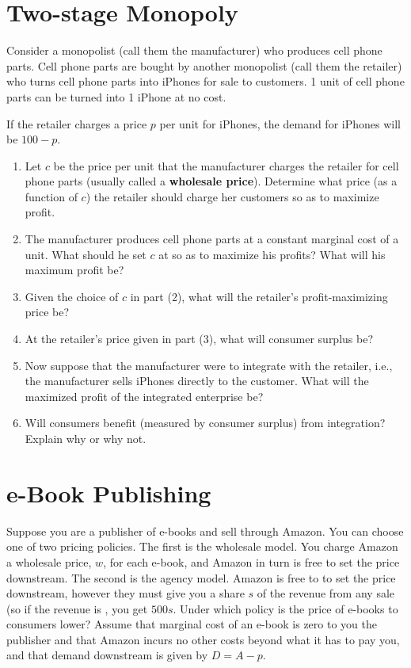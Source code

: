 \documentclass{article}
\begin{document}
\section*{Two-stage Monopoly}
Consider a monopolist (call them the manufacturer) who produces cell phone parts. Cell phone parts are bought by another monopolist (call them the retailer) who turns cell phone parts into iPhones for sale to customers. 1 unit of cell phone parts can be turned into 1 iPhone at no cost.

If the retailer charges a price $p$ per unit for iPhones, the demand for iPhones will be $100 - p$. 
\begin{enumerate}
\item Let $c$ be the price per unit that the manufacturer charges the retailer for cell phone parts (usually called a \textbf{wholesale price}). Determine what price (as a function of $c$)  the retailer should charge her customers so as to maximize profit.
\item The manufacturer produces cell phone parts at a constant marginal cost of  a unit. What should he set $c$ at so as to maximize his profits? What will his maximum profit be?
\item Given the choice of $c$ in part (2), what will the retailer's profit-maximizing price be?
\item At the retailer's price given in part (3), what will consumer surplus be?
\item Now suppose that the manufacturer were to integrate with the retailer, i.e., the manufacturer sells iPhones directly to the customer. What will the maximized profit of the integrated enterprise be?
\item Will consumers benefit (measured by consumer surplus) from integration?  Explain why or why not.
\end{enumerate}

\section*{e-Book Publishing}
Suppose you are a publisher of e-books and sell through Amazon. You can choose one of two pricing policies. The first is the wholesale model. You charge Amazon a wholesale price, $w$, for each e-book, and Amazon in turn is free to set the price downstream. The second is the agency model. Amazon is free to to set the price downstream, however they must give you a share $s$ of the revenue from any sale (so if the revenue is , you get $500s$. Under which policy is the price of e-books to consumers lower? Assume that marginal cost of an e-book is zero to you the publisher and that Amazon incurs no other costs beyond what it has to pay you, and that demand downstream is given by $D = A - p$.
\end{document}
